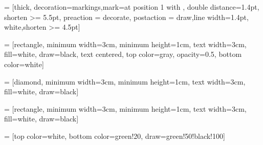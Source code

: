 
\usetikzlibrary{arrows,decorations.pathmorphing,backgrounds,positioning,fit,petri,
shapes.geometric, decorations.markings}

 = [thick, decoration={markings,mark=at position
   1 with {}},
   double distance=1.4pt, shorten >= 5.5pt,
   preaction = {decorate},
   postaction = {draw,line width=1.4pt, white,shorten >= 4.5pt}]

 = [rectangle, minimum width=3cm, minimum height=1cm,
                      text width=3cm,
                      fill=white,
                      draw=black,
                      text centered,
                      top color=gray,
                      opacity=0.5,
                      bottom color=white]
                      
 = [diamond, minimum width=3cm, minimum height=1cm,
                      text width=3cm,
                      fill=white,
                      draw=black]

 = [rectangle, minimum width=3cm, minimum height=1cm,
                      text width=3cm,
                      fill=white,
                      draw=black]
                      

 = [top color=white, bottom color=green!20, 
                         draw=green!50!black!100]


